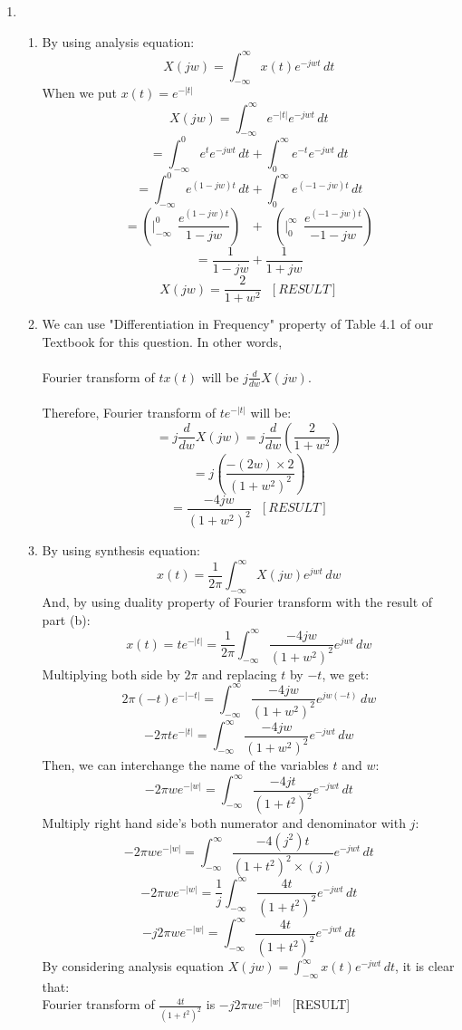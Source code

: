 \documentclass[10pt,a4paper, margin=1in]{article}
\begin{document}
\begin{enumerate}
\item %
    \begin{enumerate}
    \item %
    By using analysis equation:
    \[ X(jw) = \int_{-\infty}^{\infty} x(t)e^{-jwt} \,dt  \]
    When we put $x(t) = e^{-|t|}$
    \[ X(jw) = \int_{-\infty}^{\infty} e^{-|t|}e^{-jwt} \,dt \]
    \[ = \int_{-\infty}^{0} e^{t}e^{-jwt} \,dt + \int_{0}^{\infty} e^{-t}e^{-jwt} \,dt \]
    \[ = \int_{-\infty}^{0} e^{(1-jw)t} \,dt + \int_{0}^{\infty} e^{(-1-jw)t} \,dt \]
    \[ = \left(|_{-\infty}^{0} \ \ \frac{e^{(1-jw)t}}{1-jw} \right) \ \ \ + \ \ \ \left(|_{0}^{\infty} \ \ \frac{e^{(-1-jw)t}}{-1-jw} \right)  \]
    \[ = \frac{1}{1-jw} + \frac{1}{1+jw} \]
    \[X(jw) = \frac{2}{1+w^2} \ \ \ [RESULT] \]
     
    \item %
    We can use "Differentiation in Frequency" property of Table 4.1 of our Textbook for this question. In other words, \\
    \\
    Fourier transform of $tx(t)$ will be $j\frac{d}{dw}X(jw)$. \\
    \\
    Therefore, Fourier transform of $te^{-|t|}$ will be:
    \[ = j\frac{d}{dw}X(jw) = j\frac{d}{dw}\left(\frac{2}{1+w^2} \right) \]
    \[ = j\left(\frac{-(2w) \times 2}{(1+w^2)^2}\right) \]
    \[ = \frac{-4jw}{(1+w^2)^2} \ \ \ [RESULT] \]
    
    \item %
    By using synthesis equation:
    \[ x(t) = \frac{1}{2\pi}\int_{-\infty}^{\infty} X(jw)e^{jwt} \,dw \]
    And, by using duality property of Fourier transform with the result of part (b):
    \[ x(t) = te^{-|t|} = \frac{1}{2\pi}\int_{-\infty}^{\infty} \frac{-4jw}{(1+w^2)^2}e^{jwt} \,dw  \]
    Multiplying both side by $2\pi$ and replacing $t$ by $-t$, we get:
    \[ 2\pi(-t)e^{-|-t|} = \int_{-\infty}^{\infty} \frac{-4jw}{(1+w^2)^2}e^{jw(-t)} \,dw  \]
    \[ -2\pi te^{-|t|} = \int_{-\infty}^{\infty} \frac{-4jw}{(1+w^2)^2}e^{-jwt} \,dw  \]
    Then, we can interchange the name of the variables $t$ and $w$:
    \[ -2\pi we^{-|w|} = \int_{-\infty}^{\infty} \frac{-4jt}{(1+t^2)^2}e^{-jwt} \,dt  \]
    Multiply right hand side's both numerator and denominator with $j$:
    \[ -2\pi we^{-|w|} = \int_{-\infty}^{\infty} \frac{-4(j^2)t}{(1+t^2)^2 \times (j)}e^{-jwt} \,dt  \]
    \[ -2\pi we^{-|w|} = \frac{1}{j}\int_{-\infty}^{\infty} \frac{4t}{(1+t^2)^2}e^{-jwt} \,dt  \]
    \[ -j2\pi we^{-|w|} = \int_{-\infty}^{\infty} \frac{4t}{(1+t^2)^2}e^{-jwt} \,dt  \]
    By considering analysis equation $X(jw) = \int_{-\infty}^{\infty} x(t)e^{-jwt} \,dt$, it is clear that: \\
     Fourier transform of $\frac{4t}{(1+t^2)^2}$ is $-j2\pi we^{-|w|}$ \  [RESULT]
    \end{enumerate}


\end{enumerate}
\end{document}
